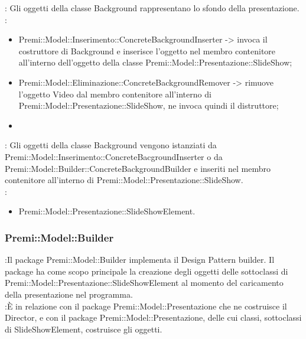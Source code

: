{{{{{                				\textbf{\tipo}: Gli oggetti della classe Background rappresentano lo sfondo della presentazione.\\
                				\textbf{\relaz}: 
                				\begin{itemize}
                					\item Premi::Model::Inserimento::ConcreteBackgroundInserter -> invoca il costruttore di Background e inserisce l’oggetto nel membro contenitore all’interno dell’oggetto della classe Premi::Model::Presentazione::SlideShow;
                                    \item Premi::Model::Eliminazione::ConcreteBackgroundRemover -> rimuove l’oggetto Video dal membro contenitore all’interno di Premi::Model::Presentazione::SlideShow, ne invoca quindi il distruttore;
                                    \item 
                				\end{itemize}	
                                \textbf{\interfacce}: Gli oggetti della classe Background vengono istanziati da Premi::Model::Inserimento::ConcreteBacgroundInserter  o da Premi::Model::Builder::ConcreteBackgroundBuilder e inseriti nel membro contenitore all’interno di Premi::Model::Presentazione::SlideShow.\\
                                \textbf{\base}: 
                                    \begin{itemize}
                                    \item Premi::Model::Presentazione::SlideShowElement.
                                    \end{itemize}
                                    }              
}

 \subsubsection{Premi::Model::Builder}{
		\textbf{\tipo}:Il package Premi::Model::Builder implementa il Design Pattern builder. Il package ha come scopo principale la creazione degli oggetti delle sottoclassi di Premi::Model::Presentazione::SlideShowElement al momento del caricamento della presentazione nel programma.\\
		\textbf{\relaz}:È in relazione con il package Premi::Model::Presentazione che ne costruisce il Director, e con il package Premi::Model::Presentazione, delle cui classi, sottoclassi di SlideShowElement, costruisce gli oggetti.

}}}}
